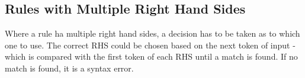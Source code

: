 \subsection{Rules with Multiple Right Hand Sides}
Where a rule ha multiple right hand sides, a decision has to be taken as to which one to use. The correct RHS could be chosen based on the next token of input - which is compared with the first token of each RHS until a match is found. If no match is found, it is a syntax error.